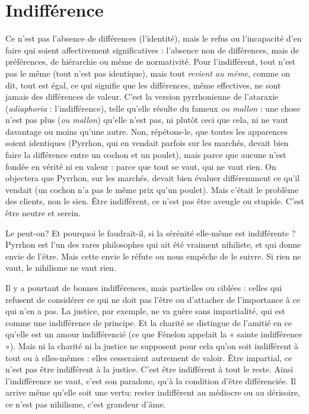 \section{Indifférence}
Ce n’est pas l’absence de différences (l'identité), mais le
refus ou l'incapacité d’en faire qui soient affectivement
significatives : l'absence non de différences, mais de préférences, de hiérarchie
ou même de normativité. Pour l’indifférent, tout n’est pas le même (tout n’est
pas identique), mais tout {\it revient au même}, comme on dit, tout est égal, ce qui
signifie que les différences, même effectives, ne sont jamais des différences de
valeur. C’est la version pyrrhonienne de l’ataraxie ({\it adiaphoria} : l'indifférence),
telle qu’elle résulte du fameux {\it ou mallon} : une chose n’est pas plus ({\it ou mallon})
qu’elle n’est pas, ni plutôt ceci que cela, ni ne vaut davantage ou moins qu’une
autre. Non, répétons-le, que toutes les apparences soient identiques (Pyrrhon,
qui en vendait parfois sur les marchés, devait bien faire la différence entre un
cochon et un poulet), mais parce que aucune n’est fondée en vérité ni en valeur :
parce que tout se vaut, qui ne vaut rien. On objectera que Pyrrhon, sur les marchés,
devait bien évaluer différemment ce qu’il vendait (un cochon n’a pas le
même prix qu’un poulet). Mais c'était le problème des clients, non le sien. Être
indifférent, ce n’est pas être aveugle ou stupide. C’est être neutre et serein.

Le peut-on? Et pourquoi le faudrait-il, si la sérénité elle-même est
indifférente ? Pyrrhon est l’un des rares philosophes qui ait été vraiment nihiliste,
et qui donne envie de l’être. Mais cette envie le réfute ou nous empêche
de le suivre. Si rien ne vaut, le nihilisme ne vaut rien.

Il y a pourtant de bonnes indifférences, mais partielles ou ciblées : celles qui
refusent de considérer ce qui ne doit pas l’être ou d’attacher de l'importance à
ce qui n’en a pas. La justice, par exemple, ne va guère sans impartialité, qui est
comme une indifférence de principe. Et la charité se distingue de l’amitié en ce
qu’elle est un amour indifférencié (ce que Fénelon appelait la « sainte
indifférence »). Mais ni la charité ni la justice ne supposent pour cela qu’on soit
indifférent à tout ou à elles-mêmes : elles cesseraient autrement de valoir. Être
impartial, ce n’est pas être indifférent à la justice. C’est être indifférent à tout le
reste. Ainsi l’indifférence ne vaut, c’est son paradoxe, qu’à la condition d’être
différenciée. Il arrive même qu’elle soit une vertu: rester indifférent au
médiocre ou au dérisoire, ce n’est pas nihilisme, c’est grandeur d’âme.

